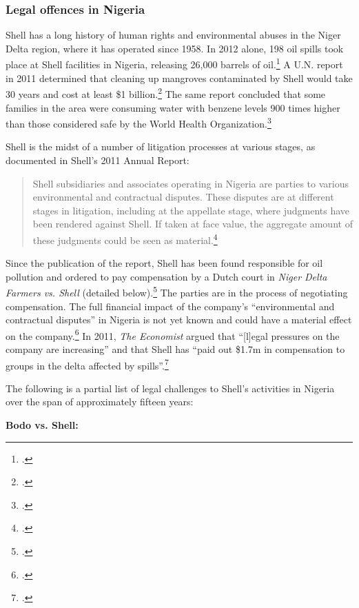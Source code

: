 \documentclass[10pt]{article}
\begin{document}
	\subsubsection{Legal offences in Nigeria}
	\label{subsec-Nigerialegal}


Shell has a long history of human rights and environmental abuses in the Niger Delta region, where it has operated since 1958.
In 2012 alone, 198 oil spills took place at Shell facilities in Nigeria, releasing 26,000 barrels of oil.\footcite{DutchResponsible}
A U.N. report in 2011 determined that cleaning up mangroves contaminated by Shell would take 30 years and cost at least \$1 billion.\footcite{Ogoniland}
The same report concluded that some families in the area were consuming water with benzene levels 900 times higher than those considered safe by the World Health Organization.\footcite{OilSpoils}



Shell is the midst of a number of litigation processes at various stages, as documented in Shell's 2011 Annual Report:
\begin{quote}
Shell subsidiaries and associates operating in Nigeria are parties to various environmental and contractual disputes.
These disputes are at different stages in litigation, including at the appellate stage, where judgments have been rendered against Shell. 
If taken at face value, the aggregate amount of these judgments could be seen as material.\footcite[][P.138]{Shell_2011}
\end{quote}
Since the publication of the report, Shell has been found responsible for oil pollution and ordered to pay compensation by a Dutch court in \emph{Niger Delta Farmers vs. Shell} (detailed below).\footcite[See also:][]{DutchResponsible}
The parties are in the process of negotiating compensation.
The full financial impact of the company's ``environmental and contractual disputes'' in Nigeria is not yet known and could have a material effect on the company.\footcite[][p. 139]{Shell_2011}
In 2011, \emph{The Economist} argued that ``[l]egal pressures on the company are increasing'' and that Shell has ``paid out \$1.7m in compensation to groups in the delta affected by spills''.\footcite{OilSpoils}


The following is a partial list of legal challenges to Shell's activities in Nigeria over the span of approximately fifteen years:



\textbf{Bodo vs. Shell:}
\end{document}
